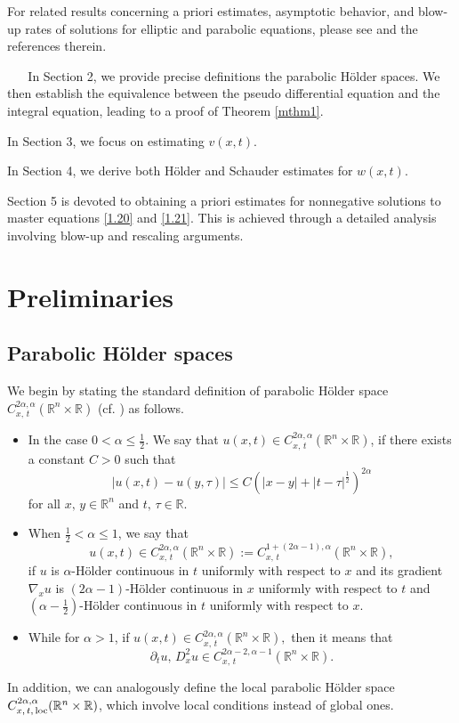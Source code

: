 \documentclass[12pt]{article}
\theoremstyle{remark}
\numberwithin{equation}{section}
\begin{document}
For related results concerning a priori estimates, asymptotic behavior, and blow-up rates of solutions for elliptic and parabolic equations, please see \cite{AV, MM, MM1, MV, MZ1, PQ, QS} and the references therein.
\medskip


\,\,\,\,\,\,\,\, In Section 2, we provide precise definitions the parabolic H\"{o}lder spaces. We then establish the equivalence between the pseudo differential equation and the integral equation, leading to a proof of Theorem \ref{mthm1}.

In Section 3, we focus on estimating $v(x,t)$.

In Section 4, we derive both H\"{o}lder and Schauder estimates for $w(x,t)$.

Section 5 is devoted to obtaining a priori estimates for nonnegative solutions to master equations \eqref{1.20} and \eqref{1.21}. This is achieved through a detailed analysis involving blow-up and rescaling arguments.


\section{Preliminaries}

\subsection{Parabolic H\"{o}lder spaces}\label{2.1}
We begin by stating the standard definition of parabolic H\"{o}lder space $C^{2\alpha,\alpha}_{x,\, t}(\mathbb{R}^n\times\mathbb{R})$ (cf. \cite{Kry}) as follows.
\begin{itemize}
\item[(i)]
In the case  $0<\alpha\leq\frac{1}{2}$. We say that
$u(x,t)\in C^{2\alpha,\alpha}_{x,\, t}(\mathbb{R}^n\times\mathbb{R})$, if there exists a constant $C>0$ such that
\begin{equation*}
  |u(x,t)-u(y,\tau)|\leq C\left(|x-y|+|t-\tau|^{\frac{1}{2}}\right)^{2\alpha}
\end{equation*}
for all $x,\,y\in\mathbb{R}^n$ and $t,\,\tau\in \mathbb{R}$.
\item[(ii)]
When $\frac{1}{2}<\alpha\leq1$, we say that
$$u(x,t)\in C^{2\alpha,\alpha}_{x,\, t}(\mathbb{R}^n\times\mathbb{R}):=C^{1+(2\alpha-1),\alpha}_{x,\, t}(\mathbb{R}^n\times\mathbb{R}),$$ if $u$ is $\alpha$-H\"{o}lder continuous in $t$ uniformly with respect to $x$ and its gradient $\nabla_xu$ is $(2\alpha-1)$-H\"{o}lder continuous in $x$ uniformly with respect to $t$ and $(\alpha-\frac{1}{2})$-H\"{o}lder continuous in $t$ uniformly with respect to $x$.
\item[(iii)] While for $\alpha>1$, if
$u(x,t)\in C^{2\alpha,\alpha}_{x,\, t}(\mathbb{R}^n\times\mathbb{R}),$
then it means that
$$\partial_tu,\, D^2_xu \in C^{2\alpha-2,\alpha-1}_{x,\, t}(\mathbb{R}^n\times\mathbb{R}).$$
\end{itemize}
In addition, we can analogously define the local parabolic H\"{o}lder space $C^{2\alpha,\alpha}_{x,\, t,\, \rm{loc}}(\mathbb{R}^n\times\mathbb{R})$, which involve local conditions instead of global ones.
\end{document}
